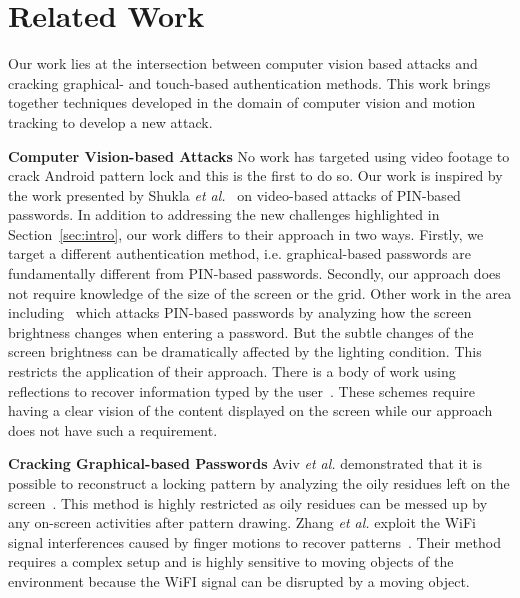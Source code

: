\section{Related Work}
Our work lies at the intersection between computer vision based attacks and
cracking graphical- and touch-based authentication methods. This work brings
together techniques developed in the domain of computer vision and motion
tracking to develop a new attack. %



\noindent \textbf{Computer Vision-based Attacks} No work has targeted using video
footage to crack Android pattern lock and this is the first to do so. Our work is inspired by the work
presented by Shukla \emph{et al.}~\cite{shukla2014beware} on video-based attacks of
PIN-based passwords. In addition to addressing the new challenges highlighted in Section~\ref{sec:intro}, our work differs to their approach in
two ways.
Firstly, we target a different authentication method, i.e. graphical-based passwords are fundamentally different from PIN-based passwords. %
Secondly, our approach does not require knowledge of the size of the screen or the grid.
Other work in the area including~\cite{yue2014blind} which attacks PIN-based passwords by analyzing how the screen brightness changes when entering a password.
But the subtle changes of the screen brightness can be dramatically affected by the lighting condition. This restricts the application of their approach.
There is a body of work using reflections to recover information typed by the user~\cite{kuhn2002compromising,xu2013seeing,raguram2011ispy,backes2009tempest}. These schemes require having a clear vision of the content displayed on the screen while our approach does not have such a requirement.

\noindent \textbf{Cracking Graphical-based Passwords} Aviv \emph{et al.} demonstrated that it is possible to reconstruct a locking pattern by analyzing the oily residues left on the screen~\cite{aviv2010smudge}.
 This method is highly restricted as oily residues can be messed up by any on-screen activities after pattern drawing.
Zhang \emph{et al.} exploit the WiFi signal interferences caused by finger motions to recover patterns~\cite{zhang2016privacy}. Their method requires a complex setup and is highly sensitive to moving objects of the environment
because the WiFI signal can be disrupted by a moving object.

